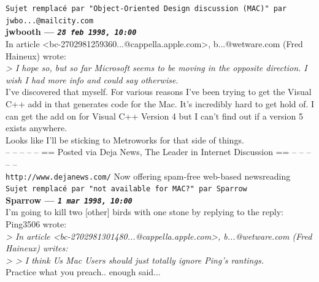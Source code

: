 \documentclass[11pt,twoside,a4paper]{article}
\begin{document}
\begin{multicols*}{2}
\texttt{Sujet remplac{\'e} par "Object-Oriented Design discussion (MAC)" par jwbo...@mailcity.com}~\\
		
	
		
\textbf{jwbooth --- \emph{\texttt{28 feb 1998, 10:00}}}~\\

In article <bc-2702981259360...@cappella.apple.com>, b...@wetware.com (Fred Haineux) wrote:~\\
\emph{> I hope so, but so far Microsoft seems to be moving in the opposite direction. I wish I had more info and could say otherwise.}~\\

I've discovered that myself. For various reasons I've been trying to get the Visual C++ add in that generates code for the Mac. It's incredibly hard to get hold of. I can get the add on for Visual C++ Version 4 but I can't find out if a version 5 exists anywhere.~\\

Looks like I'll be sticking to Metroworks for that side of things.~\\

-- -- -- -- -- == Posted via Deja News, The Leader in Internet Discussion == -- -- -- -- -- ~\\
\texttt{http://www.dejanews.com/}   Now offering spam-free web-based newsreading~\\

 
		
	
		
\texttt{Sujet remplac{\'e} par "not available for MAC?" par Sparrow}~\\
		
	
		
\textbf{Sparrow --- \emph{\texttt{1 mar 1998, 10:00}}}~\\

I'm going to kill two [other] birds with one stone by replying to the reply:~\\

Ping3506 wrote:~\\
\emph{> In article <bc-2702981301480...@cappella.apple.com>, b...@wetware.com (Fred Haineux) writes:}~\\

\emph{> > I think Us Mac Users should just totally ignore Ping's rantings.}~\\

Practice what you preach.. enough said...~\\


\end{multicols*}
\end{document}
